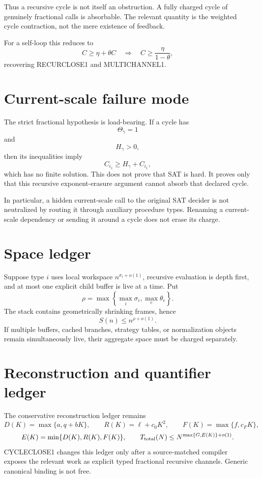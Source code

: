 \documentclass[11pt]{article}
\begin{document}
Thus a recursive cycle is not itself an obstruction. A fully charged cycle of genuinely fractional calls is absorbable. The relevant quantity is the weighted cycle contraction, not the mere existence of feedback.

For a self-loop this reduces to
\[
C\ge \eta+\theta C
\quad\Longrightarrow\quad
C\ge\frac{\eta}{1-\theta},
\]
recovering RECURCLOSE1 and MULTICHANNEL1.

\section*{Current-scale failure mode}
The strict fractional hypothesis is load-bearing. If a cycle has
\[
\Theta_\gamma=1
\]
and
\[
H_\gamma>0,
\]
then its inequalities imply
\[
C_{i_1}\ge H_\gamma+C_{i_1},
\]
which has no finite solution. This does not prove that SAT is hard. It proves only that this recursive exponent-erasure argument cannot absorb that declared cycle.

In particular, a hidden current-scale call to the original SAT decider is not neutralized by routing it through auxiliary procedure types. Renaming a current-scale dependency or sending it around a cycle does not erase its charge.

\section*{Space ledger}
Suppose type \(i\) uses local workspace \(n^{\sigma_i+o(1)}\), recursive evaluation is depth first, and at most one explicit child buffer is live at a time. Put
\[
\rho=\max\left\{\max_i\sigma_i,\max_e\theta_e\right\}.
\]
The stack contains geometrically shrinking frames, hence
\[
S(n)\le n^{\rho+o(1)}.
\]
If multiple buffers, cached branches, strategy tables, or normalization objects remain simultaneously live, their aggregate space must be charged separately.

\section*{Reconstruction and quantifier ledger}
The conservative reconstruction ledger remains
\[
D(K)=\max\{a,q+bK\},
\qquad
R(K)=\ell+c_0K^2,
\qquad
F(K)=\max\{f,c_FK\},
\]
\[
E(K)=\min\{D(K),R(K),F(K)\},
\qquad
T_{\rm total}(N)\le N^{\max\{G,E(K)\}+o(1)}.
\]
CYCLECLOSE1 changes this ledger only after a source-matched compiler exposes the relevant work as explicit typed fractional recursive channels. Generic canonical binding is not free.
\end{document}
